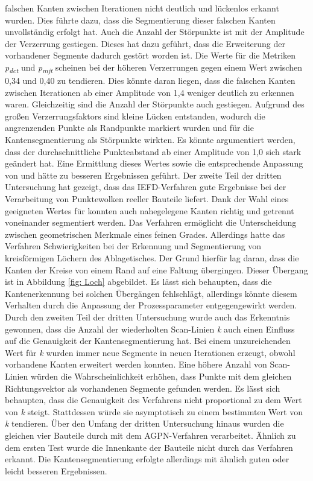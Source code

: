 falschen Kanten zwischen Iterationen nicht deutlich und lückenlos erkannt wurden. Dies führte dazu, dass die Segmentierung dieser falschen Kanten unvollständig erfolgt hat. Auch die Anzahl der Störpunkte ist mit der Amplitude der Verzerrung gestiegen. Dieses hat dazu geführt, dass die Erweiterung der vorhandener Segmente dadurch gestört worden ist. Die Werte für die Metriken  \textit{p\textsubscript{dct}} und \textit{p\textsubscript{mjt}} scheinen bei der höheren Verzerrungen gegen einem Wert zwischen 0,34 und 0,40 zu tendieren. Dies könnte daran liegen, dass die falschen Kanten zwischen Iterationen ab einer Amplitude von 1,4 weniger deutlich zu erkennen waren. Gleichzeitig sind die Anzahl der Störpunkte auch gestiegen. Aufgrund des großen Verzerrungsfaktors sind kleine Lücken entstanden, wodurch die angrenzenden Punkte als Randpunkte markiert wurden und für die Kantensegmentierung als Störpunkte wirkten. Es könnte argumentiert werden, dass der durchschnittliche Punkteabstand ab einer Amplitude von 1,0 sich stark geändert hat. Eine Ermittlung dieses Wertes sowie die entsprechende Anpassung von \distthresha und \distthreshb hätte zu besseren Ergebnissen geführt. Der zweite Teil der dritten Untersuchung hat gezeigt, dass das IEFD-Verfahren gute Ergebnisse bei der Verarbeitung von Punktewolken reeller Bauteile liefert. Dank der Wahl eines geeigneten Wertes für \distthreshb konnten auch nahegelegene Kanten richtig und getrennt voneinander segmentiert werden. Das Verfahren ermöglicht die Unterscheidung zwischen geometrischen Merkmale eines feinen Grades. Allerdings hatte das Verfahren Schwierigkeiten bei der Erkennung und Segmentierung von kreisförmigen Löchern des Ablagetisches. Der Grund hierfür lag daran, dass die Kanten der Kreise von einem Rand auf eine Faltung übergingen. Dieser Übergang ist in Abbildung \ref{fig: Loch} abgebildet. Es lässt sich behaupten, dass die Kantenerkennung bei solchen Übergängen fehlschlägt, allerdings könnte diesem Verhalten durch die Anpassung der Prozessparameter entgegengewirkt werden. Durch den zweiten Teil der dritten Untersuchung wurde auch das Erkenntnis gewonnen, dass die Anzahl der wiederholten Scan-Linien \textit{k} auch einen Einfluss auf die Genauigkeit der Kantensegmentierung hat. Bei einem unzureichenden Wert für \textit{k} wurden immer neue Segmente in neuen Iterationen erzeugt, obwohl vorhandene Kanten erweitert werden konnten. Eine höhere Anzahl von Scan-Linien würden die Wahrscheinlichkeit erhöhen, dass Punkte mit dem gleichen Richtungsvektor als vorhandenen Segmente gefunden werden. Es lässt sich behaupten, dass die Genauigkeit des Verfahrens nicht proportional zu dem Wert von \textit{k} steigt. Stattdessen würde sie asymptotisch zu einem bestimmten Wert von \textit{k} tendieren. Über den Umfang der dritten Untersuchung hinaus wurden die gleichen vier Bauteile durch mit dem AGPN-Verfahren verarbeitet. Ähnlich zu dem ersten Test wurde die Innenkante der Bauteile nicht durch das Verfahren erkannt. Die Kantensegmentierung erfolgte allerdings mit ähnlich guten oder leicht besseren Ergebnissen. 


